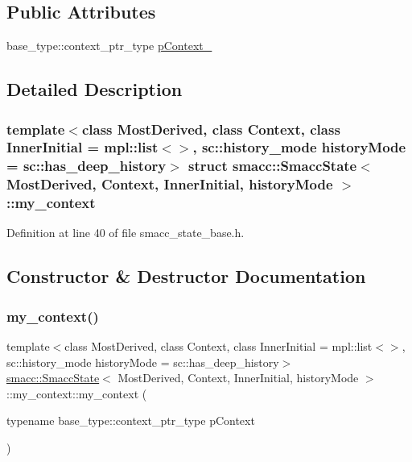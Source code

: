 \subsection*{Public Attributes}
\begin{DoxyCompactItemize}
\item 
base\+\_\+type\+::context\+\_\+ptr\+\_\+type \hyperlink{structsmacc_1_1SmaccState_1_1my__context_a85f6eff5aba687932efe3f8117be76d3}{p\+Context\+\_\+}
\end{DoxyCompactItemize}


\subsection{Detailed Description}
\subsubsection*{template$<$class Most\+Derived, class Context, class Inner\+Initial = mpl\+::list$<$$>$, sc\+::history\+\_\+mode history\+Mode = sc\+::has\+\_\+deep\+\_\+history$>$\newline
struct smacc\+::\+Smacc\+State$<$ Most\+Derived, Context, Inner\+Initial, history\+Mode $>$\+::my\+\_\+context}



Definition at line 40 of file smacc\+\_\+state\+\_\+base.\+h.



\subsection{Constructor \& Destructor Documentation}
\mbox{\label{structsmacc_1_1SmaccState_1_1my__context_af9c11c27b17bbf7de0d4e21c87d49f6f}} 
\subsubsection{\texorpdfstring{my\+\_\+context()}{my\_context()}}
{\footnotesize\ttfamily template$<$class Most\+Derived, class Context, class Inner\+Initial = mpl\+::list$<$$>$, sc\+::history\+\_\+mode history\+Mode = sc\+::has\+\_\+deep\+\_\+history$>$ \\
\hyperlink{classsmacc_1_1SmaccState}{smacc\+::\+Smacc\+State}$<$ Most\+Derived, Context, Inner\+Initial, history\+Mode $>$\+::my\+\_\+context\+::my\+\_\+context (\begin{DoxyParamCaption}\item[{typename base\+\_\+type\+::context\+\_\+ptr\+\_\+type}]{p\+Context }\end{DoxyParamCaption})\hspace{0.3cm}{\ttfamily [inline]}}



